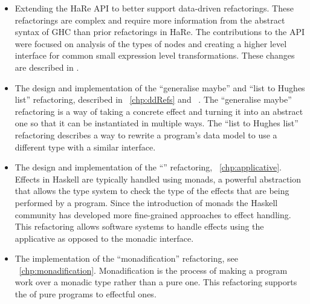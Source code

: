 \begin{itemize}
	\item Extending the HaRe API to better support data-driven refactorings. These refactorings are complex and require more information from the abstract syntax of GHC than prior refactorings in HaRe. The contributions to the API were focused on analysis of the types of nodes and creating a higher level interface for common small expression level transformations. These changes are described in \DIFdelbegin \textbf{}%
\DIFdelend \DIFaddbegin {}\DIFaddend .
	\item The design and implementation of the ``generalise maybe'' and ``list to Hughes list'' refactoring, described in \DIFdelbegin {}\DIFdelend \DIFaddbegin {}\DIFaddend ~\ref{chp:ddRefs} and ~\DIFdelbegin \DIFdel{\ref{generalImp}}\DIFdelend \DIFaddbegin \DIFadd{\ref{chp:generalImp}}\DIFaddend . The ``generalise maybe'' refactoring is a way of taking a concrete effect and turning it into an abstract one so that it can be instantiated in multiple ways. The ``list to Hughes list'' refactoring describes a way to rewrite  a program's data model to use a different type with a similar interface.
	\item The design and implementation of the ``\DIFdelbegin {}\DIFdelend \DIFaddbegin {}\DIFaddend '' refactoring, \DIFdelbegin {}\DIFdelend \DIFaddbegin {}\DIFaddend ~\ref{chp:applicative}. Effects in Haskell are typically handled using monads, a powerful abstraction that allows the type system to check the type of the effects that are being performed by a program. Since the introduction of monads the Haskell community has developed more fine-grained approaches to effect handling. This refactoring allows software systems to handle effects using the applicative as opposed to the monadic interface.
	\item The \DIFdelbegin {}\DIFdelend implementation of the ``monadification'' refactoring, see \DIFdelbegin {}\DIFdelend \DIFaddbegin {}\DIFaddend ~\ref{chp:monadification}. Monadification is the process of making a program work over a monadic type rather than a pure one. This refactoring supports the \DIFdelbegin {}\DIFdelend \DIFaddbegin {}\DIFaddend of pure programs to effectful ones.
\end{itemize}


